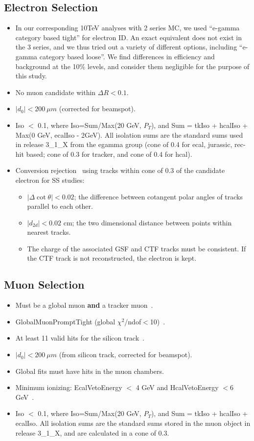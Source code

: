 \subsection{Electron Selection}
\label{sec:electron}

\begin{itemize}
\item In our corresponding 10TeV analyses with 2 series MC, we used ``e-gamma category based tight'' for electron ID.
      An exact equivalent does not exist in the 3 series, and we thus tried out a variety of different options, including ``e-gamma category based loose''.
      We find differences in efficiency and background at the 10\% levels, and consider them negligible for the purpose of this study.
\item No muon candidate within $\Delta R < 0.1$.
\item $|d_0| < 200~\mu m$ (corrected for beamspot).
\item Iso $<$ 0.1, where Iso=Sum/Max(20 GeV, $P_T$), and Sum = tkIso + hcalIso +  Max(0 GeV, ecalIso - 2GeV).
All isolation sums are the standard sums used in release 3\_1\_X from the egamma group (cone of
0.4 for ecal, jurassic, rec-hit based; cone of 0.3 for tracker, and cone of 0.4 for hcal).
\item Conversion rejection~\cite{conversion} using tracks within cone of 0.3 of the candidate electron for SS studies: 
\begin{itemize}
\item $|\Delta \cot\theta| < 0.02$; the difference between cotangent polar angles of tracks parallel to 
each other.
\item $|d_{2d}| < 0.02$ cm; the two dimensional distance between points within nearest tracks.
\item The charge of the associated GSF and CTF tracks must be consistent.
If the CTF track is not reconstructed, the electron is kept.
\end{itemize} 
\end{itemize}

\subsection{Muon Selection}
\label{sec:muon}
\begin{itemize}
\item Must be a global muon {\bf and} a tracker muon~\cite{glbtrk}.
\item GlobalMuonPromptTight (global $\chi^2$/ndof$<$10)~\cite{muonid}.
\item At least 11 valid hits for the silicon track~\cite{muonid}.
\item $|d_0| < 200~\mu m$ (from silicon track, corrected for beamspot).
\item Global fits must have hits in the muon chambers.
\item Minimum ionizing: EcalVetoEnergy $<$ 4 GeV and HcalVetoEnergy $<6$ GeV~\cite{vplusj}. 
\item Iso $<$ 0.1, where Iso=Sum/Max(20 GeV, $P_T$), and Sum = tkIso + hcalIso +  ecalIso.
All isolation sums are the standard sums stored in the muon object in release 3\_1\_X, and
are calculated in a cone of 0.3.
\end{itemize}

